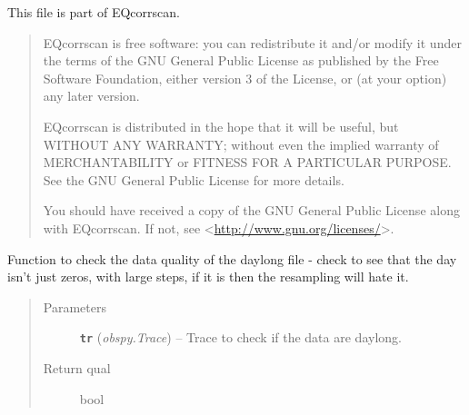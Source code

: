 \documentclass[a4paper,10pt,english]{sphinxmanual}
\begin{document}
This file is part of EQcorrscan.
\begin{quote}

EQcorrscan is free software: you can redistribute it and/or modify
it under the terms of the GNU General Public License as published by
the Free Software Foundation, either version 3 of the License, or
(at your option) any later version.

EQcorrscan is distributed in the hope that it will be useful,
but WITHOUT ANY WARRANTY; without even the implied warranty of
MERCHANTABILITY or FITNESS FOR A PARTICULAR PURPOSE.  See the
GNU General Public License for more details.

You should have received a copy of the GNU General Public License
along with EQcorrscan.  If not, see \textless{}\href{http://www.gnu.org/licenses/}{http://www.gnu.org/licenses/}\textgreater{}.
\end{quote}

\begin{fulllineitems}
\label{submodules/utils.pre_processing:pre_processing._check_daylong}
Function to check the data quality of the daylong file - check to see that
the day isn't just zeros, with large steps, if it is then the resampling will
hate it.
\begin{quote}\begin{description}
\item[{Parameters}] \leavevmode
\textbf{\texttt{tr}} (\emph{obspy.Trace}) -- Trace to check if the data are daylong.

\item[{Return qual}] \leavevmode
bool

\end{description}\end{quote}

\end{fulllineitems}

\end{document}
